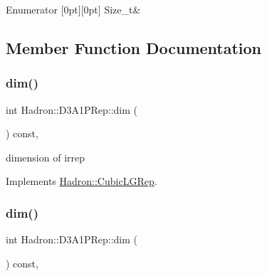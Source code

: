 \begin{DoxyEnumFields}{Enumerator}
[0pt][0pt]{}\mbox{\label{structHadron_1_1D3A1PRep_acff96bde271b6206f1689fd88f49862aa485e154be9386456862c1bc150852da8}} 
Size\+\_\+t&\\
\hline

\end{DoxyEnumFields}


\subsection{Member Function Documentation}
\mbox{\label{structHadron_1_1D3A1PRep_a250e3d75bd0193a38ca00df99dfd1936}} 
\subsubsection{\texorpdfstring{dim()}{dim()}\hspace{0.1cm}{\footnotesize\ttfamily [1/3]}}
{\footnotesize\ttfamily int Hadron\+::\+D3\+A1\+P\+Rep\+::dim (\begin{DoxyParamCaption}{ }\end{DoxyParamCaption}) const\hspace{0.3cm}{\ttfamily [inline]}, {\ttfamily [virtual]}}

dimension of irrep 

Implements \mbox{\hyperlink{structHadron_1_1CubicLGRep_a3acbaea26503ed64f20df693a48e4cdd}{Hadron\+::\+Cubic\+L\+G\+Rep}}.

\mbox{\label{structHadron_1_1D3A1PRep_a250e3d75bd0193a38ca00df99dfd1936}} 
\subsubsection{\texorpdfstring{dim()}{dim()}\hspace{0.1cm}{\footnotesize\ttfamily [2/3]}}
{\footnotesize\ttfamily int Hadron\+::\+D3\+A1\+P\+Rep\+::dim (\begin{DoxyParamCaption}{ }\end{DoxyParamCaption}) const\hspace{0.3cm}{\ttfamily [inline]}, {\ttfamily [virtual]}}

